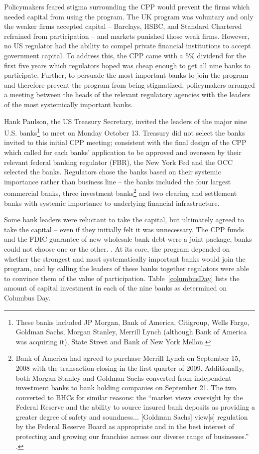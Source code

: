 \documentclass[12pt]{article}
\begin{document}
Policymakers feared stigma surrounding the CPP would prevent the firms which needed capital from using the program. The UK program was voluntary and only the weaker firms accepted capital -- Barclays, HSBC, and Standard Chartered refrained from participation -- and markets punished those weak firms. However, no US regulator had the ability to compel private financial institutions to accept government capital. To address this, the CPP came with a 5\% dividend for the first five years which regulators hoped was cheap enough to get all nine banks to participate. Further, to persuade the most important banks to join the program and therefore prevent the program from being stigmatized, policymakers arranged a meeting between the heads of the relevant regulatory agencies with the leaders of the most systemically important banks.  

Hank Paulson, the US Treasury Secretary, invited the leaders of the major nine U.S. banks\footnote{These banks included JP Morgan, Bank of America, Citigroup, Wells Fargo, Goldman Sachs, Morgan Stanley, Merrill Lynch (although Bank of America was acquiring it), State Street and Bank of New York Mellon.} to meet on Monday October 13. Treasury did not select the banks invited to this initial CPP meeting; consistent with the final design of the CPP which called for each banks' application to be approved and overseen by their relevant federal banking regulator (FBR), the New York Fed and the OCC selected the banks. Regulators chose the banks based on their systemic importance rather than business line -- the banks included the four largest commercial banks, three investment banks\footnote{Bank of America had  agreed to purchase Merrill Lynch on September 15, 2008 with the transaction closing in the first quarter of 2009. Additionally, both Morgan Stanley and Goldman Sachs converted from independent investment banks to bank holding companies on September 21. The two converted to BHCs for similar reasons: the ``market views oversight by the Federal Reserve and the ability to source insured bank deposits as providing a greater degree of safety and soundness... [Goldman Sachs] view[s] regulation by the Federal Reserve Board as appropriate and in the best interest of protecting and growing our franchise across our diverse range of businesses.'' \citep{GSBHC}.} and two clearing and settlement banks with systemic importance to underlying financial infrastructure.  

Some bank leaders were reluctant to take the capital, but ultimately agreed to take the capital -- even if they initially felt it was unnecessary. The CPP funds and the FDIC guarantee of new wholesale bank debt were a joint package, banks could not choose one or the other. \citep{Geithner}. At its core, the program depended on whether the strongest and most systematically important banks would join the program, and by calling the leaders of these banks together regulators were able to convince them of the value of participation. Table~\ref{columbusDay} lists the amount of capital investment in each of the nine banks as determined on Columbus Day. 
\end{document}
